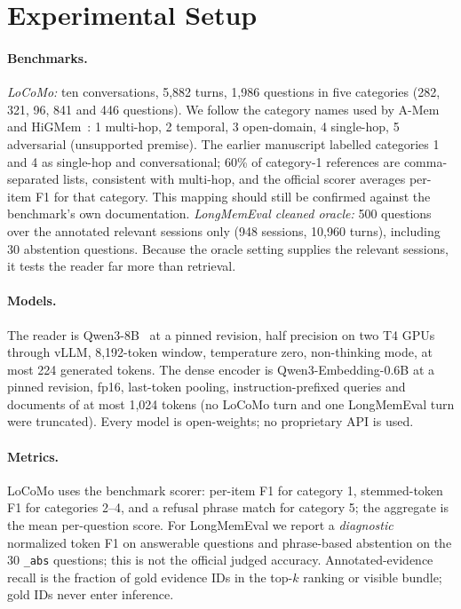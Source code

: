 \documentclass[11pt]{article}
\begin{document}
\section{Experimental Setup}
\label{sec:setup}

\paragraph{Benchmarks.}
\emph{LoCoMo:} ten conversations, 5,882 turns, 1,986 questions in five
categories (282, 321, 96, 841 and 446 questions). We follow the category names
used by A-Mem and HiGMem~\cite{amem2025,cao2026higmem}: 1 multi-hop, 2 temporal,
3 open-domain, 4 single-hop, 5 adversarial (unsupported premise). The earlier
manuscript labelled categories 1 and 4 as single-hop and conversational; 60\%
of category-1 references are comma-separated lists, consistent with multi-hop,
and the official scorer averages per-item F1 for that category. This mapping
should still be confirmed against the benchmark's own documentation.
\emph{LongMemEval cleaned oracle:} 500 questions over the annotated relevant
sessions only (948 sessions, 10,960 turns), including 30 abstention questions.
Because the oracle setting supplies the relevant sessions, it tests the reader
far more than retrieval.

\paragraph{Models.}
The reader is Qwen3-8B~\cite{yang2025qwen3} at a pinned revision, half precision
on two T4 GPUs through vLLM, 8,192-token window, temperature zero, non-thinking
mode, at most 224 generated tokens. The dense encoder is Qwen3-Embedding-0.6B
at a pinned revision, fp16, last-token pooling, instruction-prefixed queries
and documents of at most 1,024 tokens (no LoCoMo turn and one LongMemEval turn
were truncated). Every model is open-weights; no proprietary API is used.

\paragraph{Metrics.}
LoCoMo uses the benchmark scorer: per-item F1 for category 1, stemmed-token F1
for categories 2--4, and a refusal phrase match for category 5; the aggregate
is the mean per-question score. For LongMemEval we report a \emph{diagnostic}
normalized token F1 on answerable questions and phrase-based abstention on the
30 \texttt{\_abs} questions; this is not the official judged accuracy.
Annotated-evidence recall is the fraction of gold evidence IDs in the top-$k$
ranking or visible bundle; gold IDs never enter inference.
\end{document}

